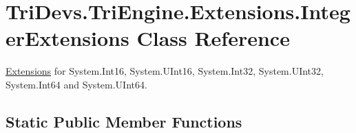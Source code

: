 \hypertarget{class_tri_devs_1_1_tri_engine_1_1_extensions_1_1_integer_extensions}{\section{Tri\-Devs.\-Tri\-Engine.\-Extensions.\-Integer\-Extensions Class Reference}
\label{class_tri_devs_1_1_tri_engine_1_1_extensions_1_1_integer_extensions}
}


\hyperlink{namespace_tri_devs_1_1_tri_engine_1_1_extensions}{Extensions} for System.\-Int16, System.\-U\-Int16, System.\-Int32, System.\-U\-Int32, System.\-Int64 and System.\-U\-Int64.  


\subsection*{Static Public Member Functions}
